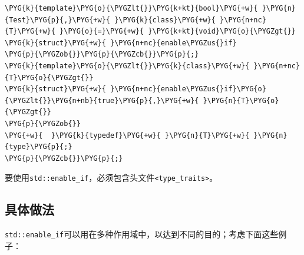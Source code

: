 \begin{codeblockbg}
\begin{Verbatim}[commandchars=\\\{\},breaklines=true,breakanywhere=true,fontsize=\codefont,xleftmargin=17bp]
\PYG{k}{template}\PYG{o}{\PYGZlt{}}\PYG{k+kt}{bool}\PYG{+w}{ }\PYG{n}{Test}\PYG{p}{,}\PYG{+w}{ }\PYG{k}{class}\PYG{+w}{ }\PYG{n+nc}{T}\PYG{+w}{ }\PYG{o}{=}\PYG{+w}{ }\PYG{k+kt}{void}\PYG{o}{\PYGZgt{}}
\PYG{k}{struct}\PYG{+w}{ }\PYG{n+nc}{enable\PYGZus{}if}
\PYG{p}{\PYGZob{}}\PYG{p}{\PYGZcb{}}\PYG{p}{;}
\PYG{k}{template}\PYG{o}{\PYGZlt{}}\PYG{k}{class}\PYG{+w}{ }\PYG{n+nc}{T}\PYG{o}{\PYGZgt{}}
\PYG{k}{struct}\PYG{+w}{ }\PYG{n+nc}{enable\PYGZus{}if}\PYG{o}{\PYGZlt{}}\PYG{n+nb}{true}\PYG{p}{,}\PYG{+w}{ }\PYG{n}{T}\PYG{o}{\PYGZgt{}}
\PYG{p}{\PYGZob{}}
\PYG{+w}{  }\PYG{k}{typedef}\PYG{+w}{ }\PYG{n}{T}\PYG{+w}{ }\PYG{n}{type}\PYG{p}{;}
\PYG{p}{\PYGZcb{}}\PYG{p}{;}
\end{Verbatim}
\end{codeblockbg}



要使用\texttt{std::\allowbreak{}enable\_\allowbreak{}if}，必须包含头文件\texttt{<\allowbreak{}type\_\allowbreak{}traits>}。



\subsection{具体做法}



\texttt{std::\allowbreak{}enable\_\allowbreak{}if}可以用在多种作用域中，以达到不同的目的；考虑下面这些例子：



